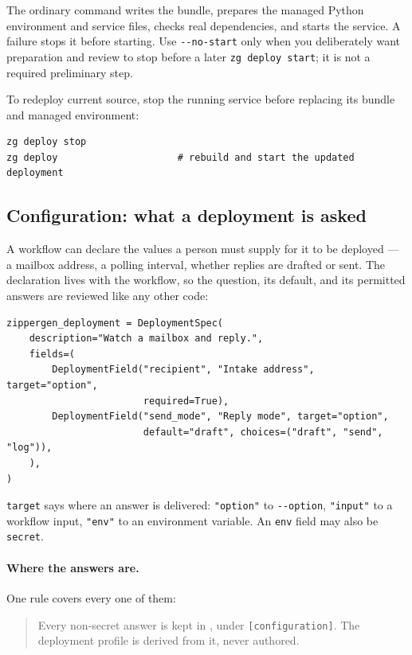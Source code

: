 \documentclass[11pt,a4paper]{article}
\begin{document}
The ordinary command writes the bundle, prepares the managed Python
environment and service files, checks real dependencies, and starts the
service. A failure stops it before starting. Use \texttt{-{}-no-start} only
when you deliberately want preparation and review to stop before a later
\texttt{zg deploy start}; it is not a required preliminary step.

To redeploy current source, stop the running service before replacing its
bundle and managed environment:

\begin{lstlisting}[style=shell]
zg deploy stop
zg deploy                     # rebuild and start the updated deployment
\end{lstlisting}

\subsection{Configuration: what a deployment is asked}

A workflow can declare the values a person must supply for it to be deployed
--- a mailbox address, a polling interval, whether replies are drafted or
sent. The declaration lives with the workflow, so the question, its default,
and its permitted answers are reviewed like any other code:

\begin{lstlisting}
zippergen_deployment = DeploymentSpec(
    description="Watch a mailbox and reply.",
    fields=(
        DeploymentField("recipient", "Intake address", target="option",
                        required=True),
        DeploymentField("send_mode", "Reply mode", target="option",
                        default="draft", choices=("draft", "send", "log")),
    ),
)
\end{lstlisting}

\texttt{target} says where an answer is delivered: \texttt{"option"} to
\texttt{-{}-option}, \texttt{"input"} to a workflow input, \texttt{"env"} to an
environment variable. An \texttt{env} field may also be \texttt{secret}.

\paragraph{Where the answers are.} One rule covers every one of them:

\begin{quote}
Every non-secret answer is kept in , under
\texttt{[configuration]}. The deployment profile is derived from it, never
authored.
\end{quote}
\end{document}
